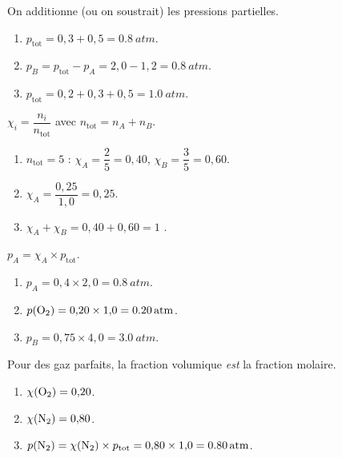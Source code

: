 \documentclass[11pt,a4paper]{article}
\begin{document}
\begin{corrige}[pression totale = somme des partielles]
On additionne (ou on soustrait) les pressions partielles.
\begin{enumerate}[label=\alph*)]
  \item $p_{\text{tot}}=0{,}3+0{,}5=\qty{0.8}{atm}$.
  \item $p_B=p_{\text{tot}}-p_A=2{,}0-1{,}2=\qty{0.8}{atm}$.
  \item $p_{\text{tot}}=0{,}2+0{,}3+0{,}5=\qty{1.0}{atm}$.
\end{enumerate}
\end{corrige}

\begin{corrige}
$\chi_i=\dfrac{n_i}{n_{\text{tot}}}$ avec $n_{\text{tot}}=n_A+n_B$.
\begin{enumerate}[label=\alph*)]
  \item $n_{\text{tot}}=5$ : $\chi_A=\dfrac{2}{5}=0{,}40$, $\chi_B=\dfrac{3}{5}=0{,}60$.
  \item $\chi_A=\dfrac{0{,}25}{1{,}0}=0{,}25$.
  \item $\chi_A+\chi_B=0{,}40+0{,}60=1$ \checkmark.
\end{enumerate}
\end{corrige}

\begin{corrige}
$p_A=\chi_A\times p_{\text{tot}}$.
\begin{enumerate}[label=\alph*)]
  \item $p_A=0{,}4\times2{,}0=\qty{0.8}{atm}$.
  \item $p(\ce{O2})=0{,}20\times1{,}0=\qty{0.20}{atm}$.
  \item $p_B=0{,}75\times4{,}0=\qty{3.0}{atm}$.
\end{enumerate}
\end{corrige}

\begin{corrige}[fraction volumique = fraction molaire]
Pour des gaz parfaits, la fraction volumique \emph{est} la fraction molaire.
\begin{enumerate}[label=\alph*)]
  \item $\chi(\ce{O2})=0{,}20$.
  \item $\chi(\ce{N2})=0{,}80$.
  \item $p(\ce{N2})=\chi(\ce{N2})\times p_{\text{tot}}=0{,}80\times1{,}0=\qty{0.80}{atm}$.
\end{enumerate}
\end{corrige}
\end{document}
